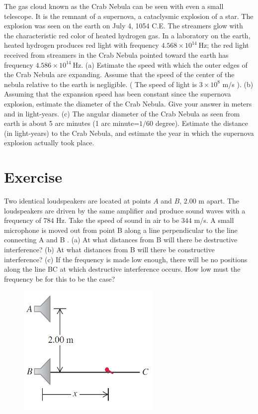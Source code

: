 \documentclass[12pt]{article}
\begin{document}
The gas cloud known as the Crab Nebula
can be seen with even a small telescope. It is the remnant of a
supernova, a cataclysmic explosion of a star. The explosion was
seen on the earth on July 4, 1054 C.E. The streamers glow with the
characteristic red color of heated hydrogen gas. In a laboratory on
the earth, heated hydrogen produces red light with frequency $4.568\times10^{14}~$Hz;
the red light received from streamers in the
Crab Nebula pointed toward the earth has frequency $4.586\times10^{14}~$Hz.
(a) Estimate the speed with which the outer edges of the
Crab Nebula are expanding. Assume that the speed of the center of
the nebula relative to the earth is negligible. ( The speed of light is $3\times10^8$ m/s
). (b) Assuming that the expansion speed has been
constant since the supernova explosion, estimate the diameter of
the Crab Nebula. Give your answer in meters and in light-years.
(c) The angular diameter of the Crab Nebula as seen from earth is
about 5 arc minutes (1 arc minute=$1/60$ degree). Estimate the distance
(in light-years) to the Crab Nebula, and estimate the year in
which the supernova explosion actually took place.






\section*{Exercise \theexample}

Two identical loudspeakers
are located at points $A$
and $B$, $2.00$ m apart. The loudspeakers
are driven by the same
amplifier and produce sound
waves with a frequency of $784$
Hz. Take the speed of sound in
air to be $344$ m/s. A small
microphone is moved out from
point B along a line perpendicular
to the line connecting A and
B . (a)
At what distances from B will there be destructive interference?
(b) At what distances from B will there be constructive interference?
(c) If the frequency is made low enough, there will be no
positions along the line BC at which destructive interference
occurs. How low must the frequency be for this to be the case?
\vspace{5mm}

 \begin{figure}[h!]
  \begin{center}
    \includegraphics[height=2.5in]{images/2.jpg}
  \end{center}
\end{figure}
\end{document}
